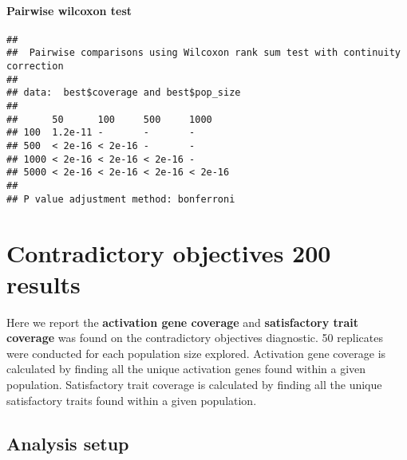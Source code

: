 \documentclass[
]{book}
\newenvironment{Shaded}{\begin{snugshade}}{\end{snugshade}}
\newcommand{\AttributeTok}[1]{\textcolor[rgb]{0.13,0.29,0.53}{#1}}
\newcommand{\ConstantTok}[1]{\textcolor[rgb]{0.56,0.35,0.01}{#1}}
\newcommand{\FunctionTok}[1]{\textcolor[rgb]{0.13,0.29,0.53}{\textbf{#1}}}
\newcommand{\NormalTok}[1]{#1}
\newcommand{\SpecialCharTok}[1]{\textcolor[rgb]{0.81,0.36,0.00}{\textbf{#1}}}
\newcommand{\StringTok}[1]{\textcolor[rgb]{0.31,0.60,0.02}{#1}}
\begin{document}
\hypertarget{pairwise-wilcoxon-test-3}{%
\subsubsection{Pairwise wilcoxon test}\label{pairwise-wilcoxon-test-3}}

\begin{Shaded}
\end{Shaded}

\begin{verbatim}
## 
##  Pairwise comparisons using Wilcoxon rank sum test with continuity correction 
## 
## data:  best$coverage and best$pop_size 
## 
##      50      100     500     1000   
## 100  1.2e-11 -       -       -      
## 500  < 2e-16 < 2e-16 -       -      
## 1000 < 2e-16 < 2e-16 < 2e-16 -      
## 5000 < 2e-16 < 2e-16 < 2e-16 < 2e-16
## 
## P value adjustment method: bonferroni
\end{verbatim}

\hypertarget{contradictory-objectives-200-results}{%
\chapter{Contradictory objectives 200 results}\label{contradictory-objectives-200-results}}

Here we report the \textbf{activation gene coverage} and \textbf{satisfactory trait coverage} was found on the contradictory objectives diagnostic.
50 replicates were conducted for each population size explored.
Activation gene coverage is calculated by finding all the unique activation genes found within a given population.
Satisfactory trait coverage is calculated by finding all the unique satisfactory traits found within a given population.

\hypertarget{analysis-setup-3}{%
\section{Analysis setup}\label{analysis-setup-3}}
\end{document}
